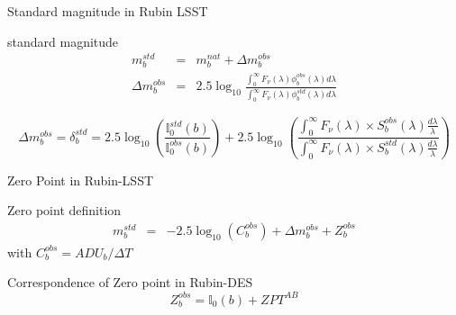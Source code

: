 \documentclass{beamer}
\begin{document}
\begin{frame}{Standard magnitude in Rubin LSST}
\begin{alertblock}{standard magnitude}
\begin{eqnarray}
m_b^{std} & = & m_b^{nat} + \Delta m_b^{obs} \\
\Delta m_b^{obs} & = & 2.5 \log_{10} \frac{\int_0^\infty F_\nu(\lambda) \phi_b^{obs}(\lambda) d\lambda}{\int_0^\infty F_\nu(\lambda) \phi_b^{std}(\lambda) d\lambda}
\end{eqnarray}
\end{alertblock}
\begin{block}{}
\begin{equation}
\Delta m_b^{obs} = \delta_b^{std} =  2.5 \log_{10}\left( \frac{\mathbb{I}_0^{std}(b)}{\mathbb{I}_0^{obs}(b)}\right) 
+ 2.5 \log_{10} 
	\left( 
	\frac{\int_0^\infty F_\nu(\lambda) \times S_b^{obs}(\lambda) \frac{d\lambda}{\lambda} }{\int_0^\infty F_\nu(\lambda) \times S_b^{std}(\lambda) \frac{d\lambda}{\lambda}} 
	\right)
\end{equation}
\end{block}
\end{frame}

\begin{frame}{Zero Point in Rubin-LSST}
\begin{exampleblock}{Zero point definition}
\begin{eqnarray}
m_b^{std} & = & -2.5 \log_{10}(C_b^{obs}) + \Delta m_b^{obs} + Z_b^{obs}
\end{eqnarray}
with $C_b^{obs} = ADU_b/\Delta T$
\end{exampleblock}
\begin{alertblock}{Correspondence of Zero point in Rubin-DES}
\begin{equation}
Z_b^{obs} = \mathbb{I}_0(b) + ZPT^{AB}
\end{equation}
\end{alertblock}
\end{frame}
\end{document}
